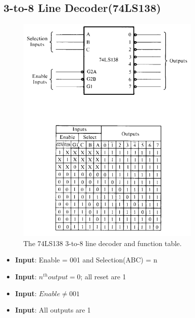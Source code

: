 \subsection{3-to-8 Line Decoder(74LS138)}
\begin{figure}[h!]
  \includegraphics[width = 0.8\textwidth]{./figures/Decoder_3_to_8.png}
  \caption{The 74LS138 3-to-8 line decoder and function table.}
  \label{}
\end{figure}

\begin{itemize}
  \item \textbf{Input}: Enable = 001 and Selection(ABC) = n
  \item \textbf{Input}: $n^{th}output = 0$; all reset are 1
\end{itemize}
\begin{itemize}
  \item \textbf{Input}: $Enable \neq 001$
  \item \textbf{Input}: All outputs are 1
\end{itemize}

